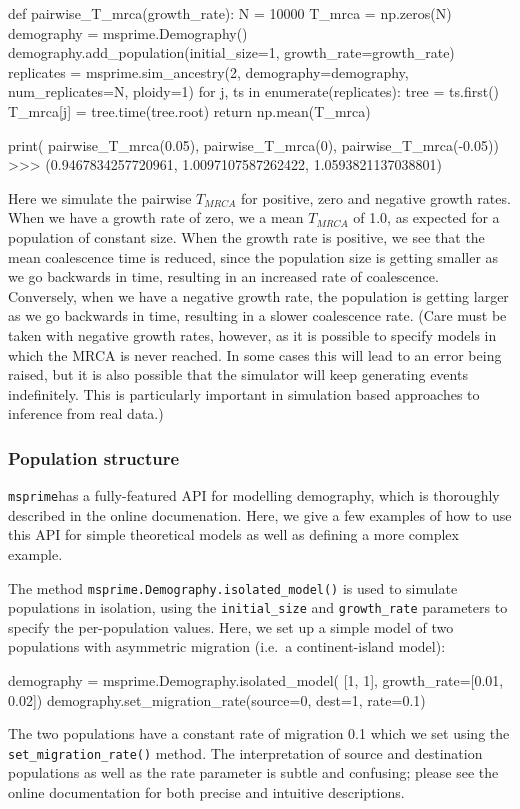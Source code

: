 \documentclass[graybox]{svmult}
\newcommand{\msprime}[0]{\texttt{msprime}}
\begin{document}
\begin{pythoncode}
def pairwise_T_mrca(growth_rate):
    N = 10000
    T_mrca = np.zeros(N)
    demography = msprime.Demography()
    demography.add_population(initial_size=1, growth_rate=growth_rate)
    replicates = msprime.sim_ancestry(2, demography=demography,
        num_replicates=N, ploidy=1)
    for j, ts in enumerate(replicates):
        tree = ts.first()
        T_mrca[j] = tree.time(tree.root)
    return np.mean(T_mrca)

print(
    pairwise_T_mrca(0.05), pairwise_T_mrca(0),
    pairwise_T_mrca(-0.05))
>>> (0.9467834257720961, 1.0097107587262422, 1.0593821137038801)
\end{pythoncode}

Here we simulate the pairwise \(T_{MRCA}\) for positive, zero and
negative growth rates. When we have a growth rate of zero, we
a mean \(T_{MRCA}\) of 1.0, as expected for a population of constant size. When the growth rate is positive, we see that the
mean coalescence time is reduced, since the population size is getting
smaller as we go backwards in time, resulting in an increased rate of
coalescence. Conversely, when we have a negative growth rate, the
population is getting larger as we go backwards in time, resulting in a
slower coalescence rate. (Care must be taken with negative growth rates,
however, as it is possible to specify models in which the MRCA is never
reached. In some cases this will lead to an error being raised, but it
is also possible that the simulator will keep generating events
indefinitely. This is particularly important in simulation based
approaches to inference from real data.)

\subsubsection{Population structure}\label{population-structure}
\msprime has a fully-featured API for modelling demography, which
is thoroughly described in the online documenation. Here, we give a few examples
of how to use this API for simple theoretical models as well as
defining a more complex example.

\label{isolated-model}
The method \texttt{msprime.Demography.isolated\_model()} is used to
simulate populations in isolation,
using the  \texttt{initial\_size} and
\texttt{growth\_rate} parameters to specify the per-population
values.
Here, we set up a simple model of two populations with asymmetric
migration (i.e.\ a continent-island model):
\begin{pythoncode}
    demography = msprime.Demography.isolated_model(
        [1, 1], growth_rate=[0.01, 0.02])
    demography.set_migration_rate(source=0, dest=1, rate=0.1)
\end{pythoncode}
The two populations have a constant rate of migration 0.1 which we set
using the \texttt{set\_migration\_rate()}
method. The interpretation of source and destination populations
as well as the rate parameter is subtle and confusing; please see
the online documentation for both precise and intuitive descriptions.
\end{document}
